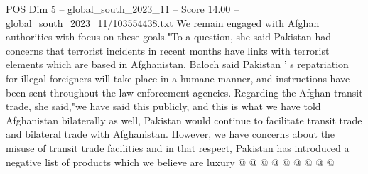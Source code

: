 \begin{textsample}{POS Dim 5 – global\_south\_2023\_11 – Score 14.00 – global\_south\_2023\_11/103554438.txt}
We remain engaged with Afghan authorities with focus on these goals."To a question, she said Pakistan had concerns that terrorist incidents in recent months have links with terrorist elements which are based in Afghanistan.
Baloch said Pakistan ' s repatriation for illegal foreigners will take place in a humane manner, and instructions have been sent throughout the law enforcement agencies.
Regarding the Afghan transit trade, she said,"we have said this publicly, and this is what we have told Afghanistan bilaterally as well, Pakistan would continue to facilitate transit trade and bilateral trade with Afghanistan.
However, we have concerns about the misuse of transit trade facilities and in that respect, Pakistan has introduced a negative list of products which we believe are luxury @ @ @ @ @ @ @ @ @

\end{textsample}
